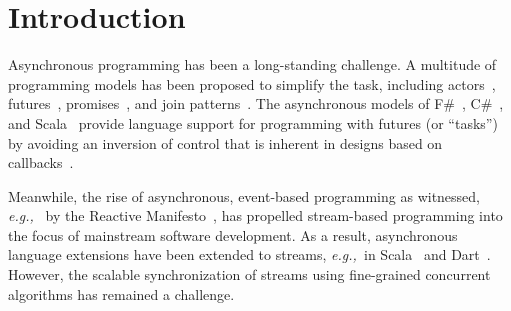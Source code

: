 \documentclass[runningheads]{llncs}
\newcommand{\eg}{{\em e.g.,~}}
\begin{document}
\begin{sloppypar}
\begin{abstract}

Asynchronous programming has been a long-standing challenge. Meanwhile, the
rise of asynchronous, event-based programming, as witnessed, \eg by the
Reactive Manifesto, has propelled stream-based programming into the focus of
mainstream software development.

This paper proposes a new approach to {\em scalable and declarative
synchronization of asynchronous event streams} based on join
patterns. Instead of introducing a new, incompatible
programming model, we present a new synchronization construct for an existing,
widely-used programming model for asynchronous streams. In order to support
the ordering constraints of streams, we adapt Turon and Russo's scalable
join-pattern matching algorithm. Furthermore, our join
synchronization construct enables integrating with flow-control mechanisms of
stream-based programming models. Thus, our implementation of join patterns is the
first to support bounded message buffers. Experimental results using micro
benchmarks show an average increase in throughput of 30-36\% compared to
the standard joins implementation of \textsc{RxJava}, a state-of-the-art
streaming implementation for the JVM.

\end{abstract}


\section{Introduction}
\label{sec:introduction}

Asynchronous programming has been a long-standing challenge. A multitude of
programming models has been proposed to simplify the task, including
actors~\cite{Hewitt77}, futures~\cite{Halstead85}, promises~\cite{LiskovS88},
and join patterns~\cite{Fournet:1996}. The asynchronous models of
F\#~\cite{SymePL11}, C\#~\cite{FormalizingAsync}, and
Scala~\cite{ScalaAsyncSIP} provide language support for programming with
futures (or ``tasks'') by avoiding an inversion of control that is inherent
in designs based on callbacks~\cite{John88a}.

Meanwhile, the rise of asynchronous, event-based programming as witnessed, \eg
by the Reactive Manifesto~\cite{ReactiveManifesto}, has propelled stream-based
programming into the focus of mainstream software development. As a result,
asynchronous language extensions have been extended to streams, \eg in
Scala~\cite{RAY} and Dart~\cite{MeijerMB15}. However, the scalable
synchronization of streams using fine-grained concurrent algorithms has
remained a challenge.


\end{sloppypar}
\end{document}
